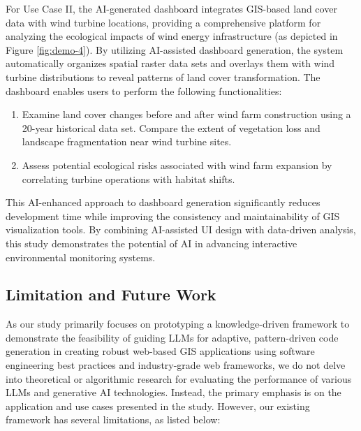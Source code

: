 For Use Case II, the AI-generated dashboard integrates GIS-based land cover data with wind turbine locations, providing a comprehensive platform for analyzing the ecological impacts of wind energy infrastructure (as depicted in Figure \ref{fig:demo-4}). By utilizing AI-assisted dashboard generation, the system automatically organizes spatial raster data sets and overlays them with wind turbine distributions to reveal patterns of land cover transformation.
The dashboard enables users to perform the following functionalities:
\begin{enumerate}
    \item Examine land cover changes before and after wind farm construction using a 20-year historical data set. Compare the extent of vegetation loss and landscape fragmentation near wind turbine sites.
    \item Assess potential ecological risks associated with wind farm expansion by correlating turbine operations with habitat shifts.
\end{enumerate}
This AI-enhanced approach to dashboard generation significantly reduces development time while improving the consistency and maintainability of GIS visualization tools. By combining AI-assisted UI design with data-driven analysis, this study demonstrates the potential of AI in advancing interactive environmental monitoring systems.
 

\subsection{Limitation and Future Work}
As our study primarily focuses on prototyping a knowledge-driven framework to demonstrate the feasibility of guiding LLMs for adaptive, pattern-driven code generation in creating robust web-based GIS applications using software engineering best practices and industry-grade web frameworks, we do not delve into theoretical or algorithmic research for evaluating the performance of various LLMs and generative AI technologies. Instead, the primary emphasis is on the application and use cases presented in the study. However, our existing framework has several limitations, as listed below: 

